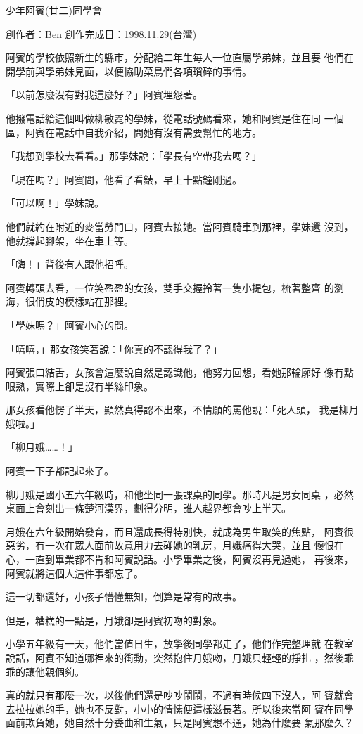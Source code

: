 



少年阿賓(廿二)同學會

創作者：Ben
創作完成日：1998.11.29(台灣)


阿賓的學校依照新生的縣市，分配給二年生每人一位直屬學弟妹，並且要
他們在開學前與學弟妹見面，以便協助菜鳥們各項瑣碎的事情。

「以前怎麼沒有對我這麼好？」阿賓埋怨著。

他撥電話給這個叫做柳敏霓的學妹，從電話號碼看來，她和阿賓是住在同
一個區，阿賓在電話中自我介紹，問她有沒有需要幫忙的地方。

「我想到學校去看看。」那學妹說：「學長有空帶我去嗎？」

「現在嗎？」阿賓問，他看了看錶，早上十點鐘剛過。

「可以啊！」學妹說。

他們就約在附近的麥當勞門口，阿賓去接她。當阿賓騎車到那裡，學妹還
沒到，他就撐起腳架，坐在車上等。

「嗨！」背後有人跟他招呼。

阿賓轉頭去看，一位笑盈盈的女孩，雙手交握拎著一隻小提包，梳著整齊
的瀏海，很俏皮的模樣站在那裡。

「學妹嗎？」阿賓小心的問。

「嘻嘻，」那女孩笑著說：「你真的不認得我了？」

阿賓張口結舌，女孩會這麼說自然是認識他，他努力回想，看她那輪廓好
像有點眼熟，實際上卻是沒有半絲印象。

那女孩看他愣了半天，顯然真得認不出來，不情願的罵他說：「死人頭，
我是柳月娥啦。」

「柳月娥……！」

阿賓一下子都記起來了。

柳月娥是國小五六年級時，和他坐同一張課桌的同學。那時凡是男女同桌
，必然桌面上會刻出一條楚河漢界，劃得分明，誰人越界都會吵上半天。

月娥在六年級開始發育，而且還成長得特別快，就成為男生取笑的焦點，
阿賓很惡劣，有一次在眾人面前故意用力去碰她的乳房，月娥痛得大哭，並且
懷恨在心，一直到畢業都不肯和阿賓說話。小學畢業之後，阿賓沒再見過她，
再後來，阿賓就將這個人這件事都忘了。

這一切都還好，小孩子懵懂無知，倒算是常有的故事。

但是，糟糕的一點是，月娥卻是阿賓初吻的對象。

小學五年級有一天，他們當值日生，放學後同學都走了，他們作完整理就
在教室說話，阿賓不知道哪裡來的衝動，突然抱住月娥吻，月娥只輕輕的掙扎
，然後乖乖的讓他親個夠。

真的就只有那麼一次，以後他們還是吵吵鬧鬧，不過有時候四下沒人，阿
賓就會去拉拉她的手，她也不反對，小小的情愫便這樣滋長著。所以後來當阿
賓在同學面前欺負她，她自然十分委曲和生氣，只是阿賓想不通，她為什麼要
氣那麼久？

